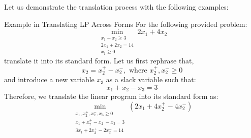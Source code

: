 Let us demonstrate the translation process with the following examples:
\begin{ln-explain}{Example in Translating LP Across Forms}{}
    For the following provided problem:
    \[
        \min_{
            \substack{
                x_1 + x_2 \geq 3 \\
                2x_1 + 2x_2 = 14 \\
                x_1 \geq 0
            }
        } 2 x_1 + 4 x_2
    \]
    translate it into its standard form.
    \tcblower
    Let us first rephrase that,
    \[
        x_2 = x_2^+ - x_2^-, \text{ where } x_2^+, x_2^- \geq 0
    \]
    and introduce a new variable $x_3$ as a slack variable such that:
    \[
        x_1 + x_2 - x_3 = 3
    \]
    Therefore, we translate the linear program into its standard form as:
    \[
        \min_{
            \substack{
                x_1, x_2^+, x_2^-, x_3 \geq 0 \\
                x_1 + x_2^+ - x_2^- - x_3 = 3 \\
                3x_1 + 2x_2^+ - 2x_2^- = 14
            }
        } (2 x_1 + 4 x_2^+ - 4x_2^-)
    \]
\end{ln-explain}

